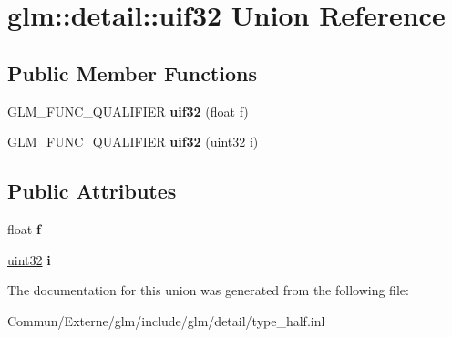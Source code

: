 \hypertarget{unionglm_1_1detail_1_1uif32}{}\section{glm\+:\+:detail\+:\+:uif32 Union Reference}
\label{unionglm_1_1detail_1_1uif32}
\subsection*{Public Member Functions}
\begin{DoxyCompactItemize}
\item 
G\+L\+M\+\_\+\+F\+U\+N\+C\+\_\+\+Q\+U\+A\+L\+I\+F\+I\+ER {\bfseries uif32} (float f)\hypertarget{unionglm_1_1detail_1_1uif32_ae86c2bd42a88f11e3217d14e46606971}{}\label{unionglm_1_1detail_1_1uif32_ae86c2bd42a88f11e3217d14e46606971}

\item 
G\+L\+M\+\_\+\+F\+U\+N\+C\+\_\+\+Q\+U\+A\+L\+I\+F\+I\+ER {\bfseries uif32} (\hyperlink{group__gtc__type__precision_ga202b6a53c105fcb7e531f9b443518451}{uint32} i)\hypertarget{unionglm_1_1detail_1_1uif32_a3d5981678c930776894daf8e94295fe2}{}\label{unionglm_1_1detail_1_1uif32_a3d5981678c930776894daf8e94295fe2}

\end{DoxyCompactItemize}
\subsection*{Public Attributes}
\begin{DoxyCompactItemize}
\item 
float {\bfseries f}\hypertarget{unionglm_1_1detail_1_1uif32_a5f697f84c5a8ec72c2f3a4f705f5bde8}{}\label{unionglm_1_1detail_1_1uif32_a5f697f84c5a8ec72c2f3a4f705f5bde8}

\item 
\hyperlink{group__gtc__type__precision_ga202b6a53c105fcb7e531f9b443518451}{uint32} {\bfseries i}\hypertarget{unionglm_1_1detail_1_1uif32_a981c1c59e160db23c73908cd7e629229}{}\label{unionglm_1_1detail_1_1uif32_a981c1c59e160db23c73908cd7e629229}

\end{DoxyCompactItemize}


The documentation for this union was generated from the following file\+:\begin{DoxyCompactItemize}
\item 
Commun/\+Externe/glm/include/glm/detail/type\+\_\+half.\+inl\end{DoxyCompactItemize}
